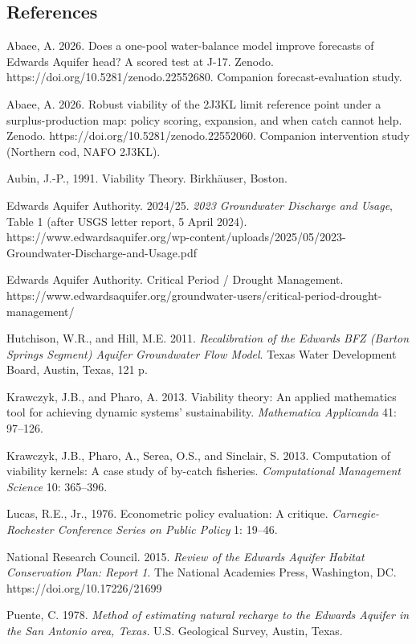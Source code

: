 \documentclass[11pt]{article}
\begin{document}
\subsection{References}\label{references}

Abaee, A. 2026. Does a one-pool water-balance model improve forecasts of
Edwards Aquifer head? A scored test at J-17. Zenodo.
https://doi.org/10.5281/zenodo.22552680. Companion forecast-evaluation
study.

Abaee, A. 2026. Robust viability of the 2J3KL limit reference point
under a surplus-production map: policy scoring, expansion, and when
catch cannot help. Zenodo. https://doi.org/10.5281/zenodo.22552060.
Companion intervention study (Northern cod, NAFO 2J3KL).

Aubin, J.-P., 1991. Viability Theory. Birkh\"auser, Boston.

Edwards Aquifer Authority. 2024/25. \emph{2023 Groundwater Discharge and
Usage}, Table 1 (after USGS letter report, 5 April 2024).
https://www.edwardsaquifer.org/wp-content/uploads/2025/05/2023-Groundwater-Discharge-and-Usage.pdf

Edwards Aquifer Authority. Critical Period / Drought Management.
https://www.edwardsaquifer.org/groundwater-users/critical-period-drought-management/

Hutchison, W.R., and Hill, M.E. 2011. \emph{Recalibration of the Edwards
BFZ (Barton Springs Segment) Aquifer Groundwater Flow Model}. Texas
Water Development Board, Austin, Texas, 121 p.

Krawczyk, J.B., and Pharo, A. 2013. Viability theory: An applied
mathematics tool for achieving dynamic systems' sustainability.
\emph{Mathematica Applicanda} 41: 97--126.

Krawczyk, J.B., Pharo, A., Serea, O.S., and Sinclair, S. 2013.
Computation of viability kernels: A case study of by-catch fisheries.
\emph{Computational Management Science} 10: 365--396.

Lucas, R.E., Jr., 1976. Econometric policy evaluation: A critique.
\emph{Carnegie-Rochester Conference Series on Public Policy} 1: 19--46.

National Research Council. 2015. \emph{Review of the Edwards Aquifer
Habitat Conservation Plan: Report 1}. The National Academies Press,
Washington, DC. https://doi.org/10.17226/21699

Puente, C. 1978. \emph{Method of estimating natural recharge to the
Edwards Aquifer in the San Antonio area, Texas.} U.S. Geological Survey,
Austin, Texas.
\end{document}
